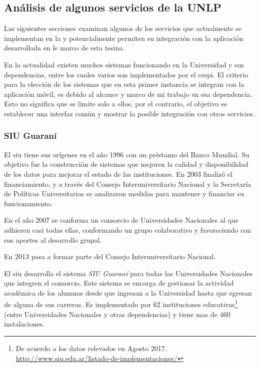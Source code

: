 \subsection{Análisis de algunos servicios de la UNLP}
\label{analisis_servicios_unlp}

Las siguientes secciones examinan algunos de los servicios que actualmente se implementan en la \unlp{} y potencialmente permiten su integración con la aplicación desarrollada en le marco de esta tesina.

En la actualidad existen muchos sistemas funcionando en la Universidad y sus dependencias, entre los cuales varios son implementados por el \gls{cespi}. El criterio para la elección de los sistemas que en esta primer instancia se integran con la aplicación móvil, es debido al alcance y marco de mi trabajo en esa dependencia.
Esto no significa que se limite solo a ellos, por el contrario, el objetivo es establecer una interfaz común y mostrar la posible integración con otros servicios.

\subsubsection{SIU Guaraní}
\label{guarani}

El \gls{siu} tiene sus orígenes en el año 1996 con un préstamo del Banco Mundial. Su objetivo fue la construcción de sistemas que mejoren la calidad y disponibilidad de los datos para mejorar el estado de las instituciones\cite{siu}. En 2003 finalizó el financiamiento, y a través del Consejo Interuniversitario Nacional y la Secretaría de Políticas Universitarias se analizaron medidas para mantener y financiar su funcionamiento.

En el año 2007 se conforma un consorcio de Universidades Nacionales al que adhieren casi todas ellas, conformando un grupo colaborativo y favoreciendo con sus aportes al desarrollo grupal.

En 2013 pasa a formar parte del Consejo Interuniversitario Nacional.

El \gls{siu} desarrolla el sistema \textit{SIU Guaraní} para todas las Universidades Nacionales que integren el consorcio. Este sistema se encarga de gestionar la actividad académica de los alumnos desde que ingresan a la Universidad hasta que egresan de alguna de sus carreras. Es implementado por 62 instituciones educativas\footnote{De acuerdo a los datos relevados en Agosto 2017. \url{http://www.siu.edu.ar/listado-de-implementaciones/}} (entre Universidades Nacionales y otras dependencias) y tiene mas de 460 instalaciones.

